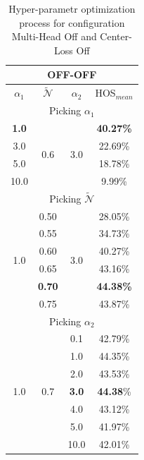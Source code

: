 \documentclass[10pt,twocolumn,letterpaper]{article}
\begin{document}
\begin{table}[hb!]
  \centering
  \begin{tabular}[h]{||c|c|c||c||}
    \hline
    \multicolumn{4}{||c||}{OFF-OFF} \\
    \hline
    $\alpha_1$ & $\mathcal{\tilde N}$ & $\alpha_2$ & HOS$_{mean}$\\    
    \hline
    \hline
    \multicolumn{4}{||c||}{Picking $\alpha_1$} \\
    \hline
    {\bf 1.0}  & \multirow{4}{*}{0.6} & \multirow{4}{*}{3.0} & {\bf 40.27\%} \\
    3.0  & & & 22.69\% \\
    5.0  & & & 18.78\% \\
    10.0 & & & 9.99\% \\
    \hline
    \hline
    \multicolumn{4}{||c||}{Picking $\mathcal{\tilde N}$} \\
    \hline
    \multirow{6}{*}{1.0} & 0.50 & \multirow{6}{*}{3.0}  & 28.05\%\\
    & 0.55 & & 34.73\% \\
    & 0.60 & & 40.27\% \\
    & 0.65 & & 43.16\% \\
    & {\bf 0.70} & & {\bf 44.38\%} \\
    & 0.75 & & 43.87\% \\
    \hline
    \hline
    \multicolumn{4}{||c||}{Picking $\alpha_2$} \\
    \hline
    \multirow{7}{*}{1.0} & \multirow{7}{*}{0.7} & 0.1 & 42.79\%\\
    && 1.0 & 44.35\% \\
    && 2.0 & 43.53\% \\
    && {\bf 3.0} & {\bf 44.38}\% \\
    && 4.0 & 43.12\% \\
    && 5.0 & 41.97\% \\
    && 10.0 & 42.01\% \\
    \hline
  \end{tabular}
  \caption{\centering\label{tab:ablationoffoff} Hyper-parametr optimization process for configuration Multi-Head Off and Center-Loss Off}
\end{table}
\end{document}
